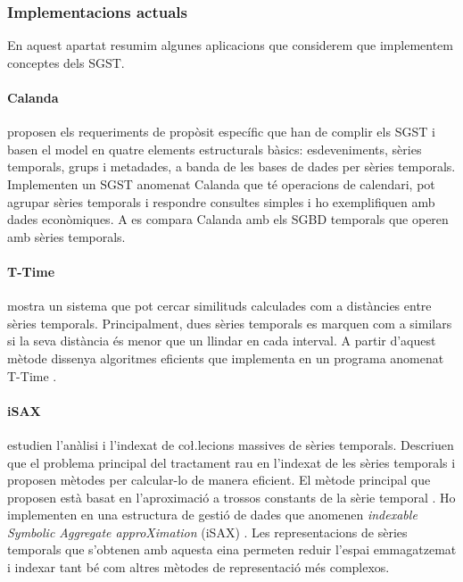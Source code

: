 \subsubsection{Implementacions actuals}

En aquest apartat resumim algunes aplicacions que considerem que implementem conceptes dels SGST.


\paragraph{Calanda} \textcite{dreyer94} proposen els requeriments de propòsit específic que han de complir els SGST i basen el model en quatre elements estructurals bàsics: esdeveniments, sèries temporals, grups i metadades, a banda de les bases de dades per sèries temporals. Implementen un SGST anomenat Calanda \parencite{dreyer94b,dreyer95,dreyer95b} que té operacions de calendari, pot agrupar sèries temporals i respondre consultes simples i ho exemplifiquen amb dades econòmiques. A \cite{schmidt95} es compara Calanda amb els SGBD temporals que operen amb sèries temporals. 




\paragraph{T-Time}  \textcite{assfalg08:thesis} mostra un sistema que pot cercar similituds calculades com a distàncies entre sèries temporals. Principalment, dues sèries temporals es marquen com a similars si la seva distància és menor que un llindar en cada interval. A partir d'aquest mètode dissenya algoritmes eficients que implementa en un programa anomenat T-Time \parencite{assfalg08:ttime}.


 
\paragraph{iSAX} \textcite{keogh08:isax,keogh10:isax} estudien l'anàlisi i l'indexat de co\l.lecions massives de sèries temporals. Descriuen que el problema principal del tractament rau en l'indexat de les sèries temporals i proposen mètodes per calcular-lo de manera eficient. El mètode principal que proposen està basat en l'aproximació a trossos constants de la sèrie temporal \parencite{keogh00}.  Ho implementen en una estructura de gestió de dades que anomenen \emph{indexable Symbolic Aggregate approXimation} (iSAX) \parencite{isax}. Les representacions de sèries temporals que s'obtenen amb aquesta eina permeten reduir l'espai emmagatzemat i indexar tant bé com altres mètodes de representació més complexos.




